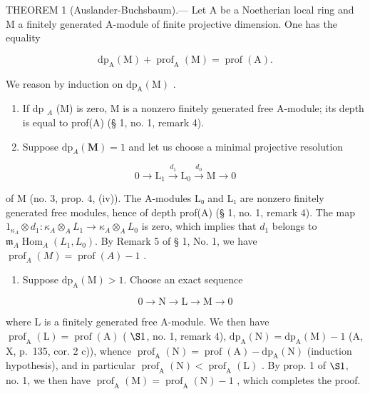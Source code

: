 THEOREM 1 (Auslander-Buchsbaum).--- Let A be a Noetherian local ring and M a finitely generated A-module of finite projective dimension. One has the equality

\[
\mathrm{dp} _ {\mathrm{A}} (\mathrm{M}) + \operatorname{prof} _ {\mathrm{A}} (\mathrm{M}) = \operatorname{prof} (\mathrm{A}).
\]

We reason by induction on \(\mathrm{dp}_{\mathrm{A}}(\mathrm{M})\) .

\begin{enumerate}
\def\labelenumi{\alph{enumi})}
\item
  If dp \(_{A}\) (M) is zero, M is a nonzero finitely generated free A-module; its depth is equal to prof(A) (§ 1, no. 1, remark 4).
\item
  Suppose \(\mathrm{dp}_{A}(\mathbf{M}) = 1\) and let us choose a minimal projective resolution
\end{enumerate}

\[
0 \to \mathrm{L} _ {1} \xrightarrow {d _ {1}} \mathrm{L} _ {0} \xrightarrow {d _ {0}} \mathrm{M} \to 0
\]

of M (no. 3, prop. 4, (iv)). The A-modules L₀ and L₁ are nonzero finitely generated free modules, hence of depth prof(A) (§ 1, no. 1, remark 4). The map \(1_{\kappa_{A}} \otimes d_{1} : \kappa_{A} \otimes_{A} L_{1} \longrightarrow \kappa_{A} \otimes_{A} L_{0}\) is zero, which implies that \(d_{1}\) belongs to \(\mathfrak{m}_{A} \operatorname{Hom}_{A}(L_{1}, L_{0})\). By Remark 5 of § 1, No. 1, we have \(\operatorname{prof}_{A}(M) = \operatorname{prof}(A) - 1\) .

\begin{enumerate}
\def\labelenumi{\alph{enumi})}
\setcounter{enumi}{2}
\tightlist
\item
  Suppose \(\mathrm{dp}_{\mathrm{A}}(\mathrm{M}) > 1\). Choose an exact sequence
\end{enumerate}

\[
0 \to \mathrm{N} \longrightarrow \mathrm{L} \longrightarrow \mathrm{M} \to 0
\]

where L is a finitely generated free A-module. We then have \(\operatorname{prof}_{\mathrm{A}}(\mathrm{L}) = \operatorname{prof}(\mathrm{A})\) ( \(\S 1\), no. 1, remark 4), \(\mathrm{dp}_{\mathrm{A}}(\mathrm{N}) = \mathrm{dp}_{\mathrm{A}}(\mathrm{M}) - 1\) (A, X, p.~135, cor. 2 c)), whence \(\operatorname{prof}_{\mathrm{A}}(\mathrm{N}) = \operatorname{prof}(\mathrm{A}) - \mathrm{dp}_{\mathrm{A}}(\mathrm{N})\) (induction hypothesis), and in particular \(\operatorname{prof}_{\mathrm{A}}(\mathrm{N}) < \operatorname{prof}_{\mathrm{A}}(\mathrm{L})\) . By prop. 1 of \(\S 1\), no. 1, we then have \(\operatorname{prof}_{\mathrm{A}}(\mathrm{M}) = \operatorname{prof}_{\mathrm{A}}(\mathrm{N}) - 1\) , which completes the proof.

